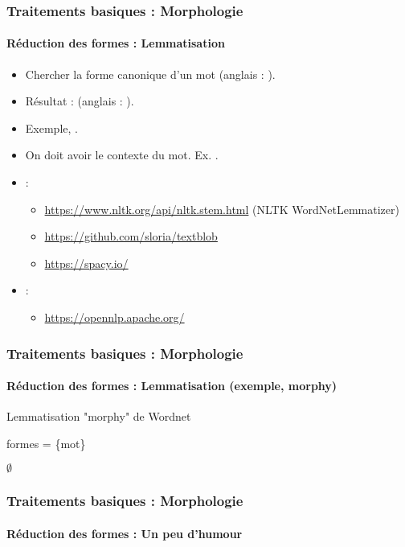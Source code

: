 \documentclass[xcolor=table]{beamer}
\begin{document}
\begin{frame}
\frametitle{Traitements basiques : Morphologie}
\framesubtitle{Réduction des formes : Lemmatisation}

\begin{itemize}
	\item Chercher la forme canonique d'un mot (anglais : ).
	\item Résultat :  (anglais : ).
	\item Exemple, .
	\item On doit avoir le contexte du mot. Ex. .
	\item {} :
	\begin{itemize}
		\item \url{https://www.nltk.org/api/nltk.stem.html} (NLTK WordNetLemmatizer)
		\item \url{https://github.com/sloria/textblob}
		\item \url{https://spacy.io/}
	\end{itemize}
	\item {} :
	\begin{itemize}
		\item \url{https://opennlp.apache.org/}
	\end{itemize}
\end{itemize}

\end{frame}

\begin{frame}[fragile]
\frametitle{Traitements basiques : Morphologie}
\framesubtitle{Réduction des formes : Lemmatisation (exemple, morphy)}

\begin{block}{Lemmatisation "morphy" de Wordnet}
	\footnotesize
	\begin{algorithm}[H]
		
		
		formes = \{mot\}
		
		
		\Return $ \emptyset $\;

	\end{algorithm}
\end{block}

\end{frame}

\begin{frame}
\frametitle{Traitements basiques : Morphologie}
\framesubtitle{Réduction des formes : Un peu d'humour}


\end{frame}

\end{document}
